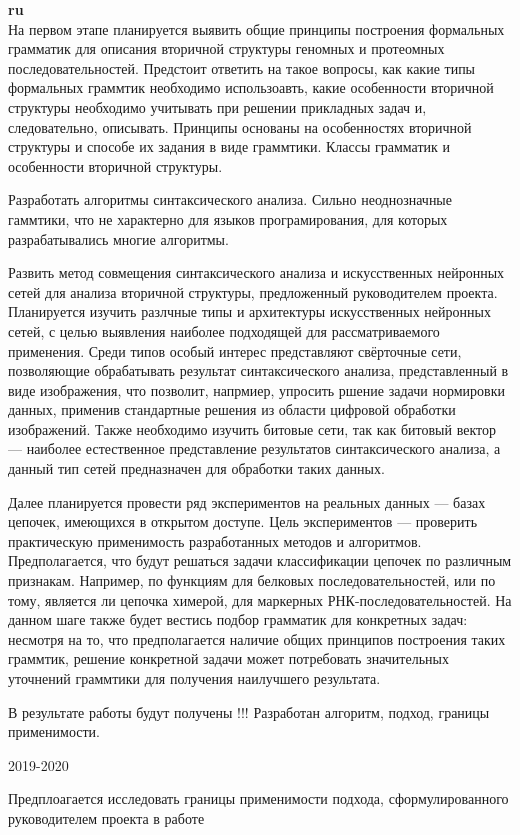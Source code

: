 \documentclass[12pt]{article}  %
\theoremstyle{remark}
\begin{document}
\textbf{ru}\\
На первом этапе планируется выявить общие принципы построения формальных грамматик для описания вторичной структуры геномных и протеомных последовательностей. Предстоит ответить на такое вопросы, как какие типы формальных граммтик необходимо использоавть, какие особенности вторичной структуры необходимо учитывать при решении прикладных задач и, следовательно, описывать.
Принципы основаны на особенностях вторичной структуры и способе их задания в виде граммтики.
Классы грамматик и особенности вторичной структуры.

Разработать алгоритмы синтаксического анализа.
Сильно неоднозначные гаммтики, что не характерно для языков програмирования, для которых разрабатывались многие алгоритмы.

Развить метод совмещения синтаксического анализа и искусственных нейронных сетей для анализа вторичной структуры, предложенный руководителем проекта.
Планируется изучить разлчные типы и архитектуры искусственных нейронных сетей, с целью выявления наиболее подходящей для рассматриваемого применения.
Среди типов особый интерес представляют свёрточные сети, позволяющие обрабатывать результат синтаксического анализа, представленный в виде изображения, что позволит, напрмиер, упросить ршение задачи нормировки данных, применив стандартные решения из области цифровой обработки изображений.
Также необходимо изучить битовые сети, так как битовый вектор --- наиболее естественное представление результатов синтаксического анализа, а данный тип сетей предназначен для обработки таких данных.

Далее планируется провести ряд экспериментов на реальных данных --- базах цепочек, имеющихся в открытом доступе.
Цель экспериментов --- проверить практическую применимость разработанных методов и алгоритмов.
Предполагается, что будут решаться задачи классификации цепочек по различным признакам.
Например, по функциям для белковых последовательностей, или по тому, является ли цепочка химерой, для маркерных РНК-последовательностей.
На данном шаге также будет вестись подбор грамматик для конкретных задач: несмотря на то, что предполагается наличие общих принципов построения таких граммтик, решение конкретной задачи может потребовать значительных уточнений граммтики для получения наилучшего результата.

В результате работы будут получены !!! Разработан алгоритм, подход, границы применимости.

2019-2020

Предплоагается исследовать границы применимости подхода, сформулированного руководителем проекта в работе
\end{document}
